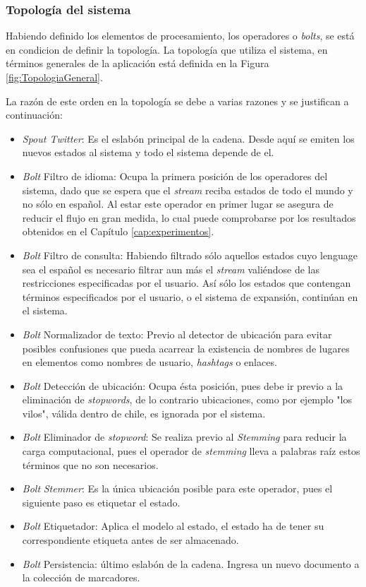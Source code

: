 \subsubsection*{Topología del sistema}
\label{subsubsec:topologiaSistema}

Habiendo definido los elementos de procesamiento, los operadores o \textit{bolts}, se está en condicion de definir la topología. La topología que utiliza el sistema, en términos generales de la aplicación está definida en la Figura \ref{fig:TopologiaGeneral}.

La razón de este orden en la topología se debe a varias razones y se justifican a continuación:

\begin{itemize}
\item \textit{Spout Twitter}: Es el eslabón principal de la cadena. Desde aquí se emiten los nuevos estados al sistema y todo el sistema depende de el. 
\item \textit{Bolt} Filtro de idioma: Ocupa la primera posición de los operadores del sistema, dado que se espera que el \textit{stream} reciba estados de todo el mundo y no sólo en español. Al estar este operador en primer lugar se asegura de reducir el flujo en gran medida, lo cual puede comprobarse por los resultados obtenidos en el Capítulo \ref{cap:experimentos}.
\item \textit{Bolt} Filtro de consulta: Habiendo filtrado sólo aquellos estados cuyo lenguage sea el español es necesario filtrar aun más el \textit{stream} valiéndose de las restricciones especificadas por el usuario. Así sólo los estados que contengan términos especificados por el usuario, o el sistema de expansión, continúan en el sistema.
\item\textit{Bolt} Normalizador de texto: Previo al detector de ubicación para evitar posibles confusiones que pueda acarrear la existencia de nombres de lugares en elementos como nombres de usuario, \textit{hashtags} o enlaces.
\item\textit{Bolt} Detección de ubicación: Ocupa ésta posición, pues debe ir previo a la eliminación de \textit{stopwords}, de lo contrario ubicaciones, como por ejemplo "los vilos", válida dentro de chile, es ignorada por el sistema.
\item\textit{Bolt} Eliminador de \textit{stopword}: Se realiza previo al \textit{Stemming} para reducir la carga computacional, pues el operador de \textit{stemming} lleva a palabras raíz estos términos que no son necesarios.
\item\textit{Bolt} \textit{Stemmer}: Es la única ubicación posible para este operador, pues el siguiente paso es etiquetar el estado.
\item\textit{Bolt} Etiquetador: Aplica el modelo al estado, el estado ha de tener su correspondiente etiqueta antes de ser almacenado.
\item\textit{Bolt} Persistencia: último eslabón de la cadena. Ingresa un nuevo documento a la colección de marcadores.
\end{itemize}

